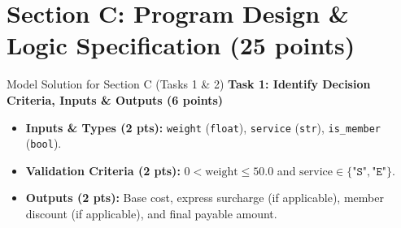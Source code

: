 \documentclass[11pt,a4paper]{article}
\begin{document}
\section*{Section C: Program Design \& Logic Specification (25 points)}

\begin{solbox}{Model Solution for Section C (Tasks 1 \& 2)}
\textbf{Task 1: Identify Decision Criteria, Inputs \& Outputs (6 points)}
\begin{itemize}[leftmargin=2em]
  \item \textbf{Inputs \& Types (2 pts):} \texttt{weight} (\texttt{float}), \texttt{service} (\texttt{str}), \texttt{is\_member} (\texttt{bool}).
  \item \textbf{Validation Criteria (2 pts):} $0 < \text{weight} \le 50.0$ and $\text{service} \in \{\texttt{"S"}, \texttt{"E"}\}$.
  \item \textbf{Outputs (2 pts):} Base cost, express surcharge (if applicable), member discount (if applicable), and final payable amount.
\end{itemize}


\end{solbox}
\end{document}
